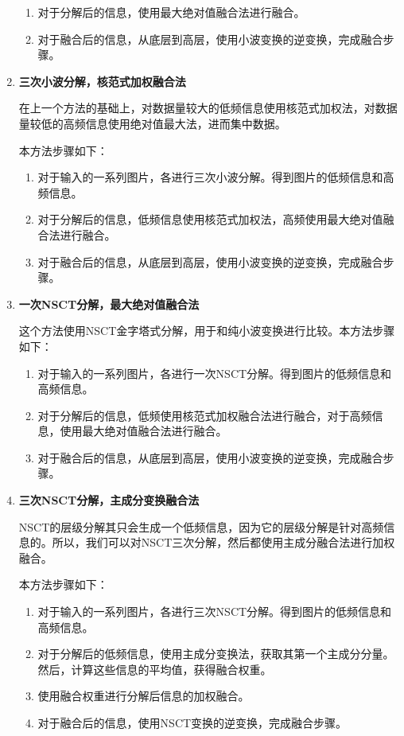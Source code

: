\documentclass{xduugthesis}
\begin{document}
\begin{enumerate}
\begin{enumerate}
	\item 对于分解后的信息，使用最大绝对值融合法进行融合。
	\item 对于融合后的信息，从底层到高层，使用小波变换的逆变换，完成融合步骤。
\end{enumerate}
\item \textbf{三次小波分解，核范式加权融合法}\par
在上一个方法的基础上，对数据量较大的低频信息使用核范式加权法，对数据量较低的高频信息使用绝对值最大法，进而集中数据。\par
本方法步骤如下：
\begin{enumerate}
	\item 对于输入的一系列图片，各进行三次小波分解。得到图片的低频信息和高频信息。
	\item 对于分解后的信息，低频信息使用核范式加权法，高频使用最大绝对值融合法进行融合。
	\item 对于融合后的信息，从底层到高层，使用小波变换的逆变换，完成融合步骤。
\end{enumerate}
\item \textbf{一次NSCT分解，最大绝对值融合法}\par
这个方法使用NSCT金字塔式分解，用于和纯小波变换进行比较。本方法步骤如下：
\begin{enumerate}
	\item 对于输入的一系列图片，各进行一次NSCT分解。得到图片的低频信息和高频信息。
	\item 对于分解后的信息，低频使用核范式加权融合法进行融合，对于高频信息，使用最大绝对值融合法进行融合。
	\item 对于融合后的信息，从底层到高层，使用小波变换的逆变换，完成融合步骤。
\end{enumerate}
\item \textbf{三次NSCT分解，主成分变换融合法}\par
NSCT的层级分解其只会生成一个低频信息，因为它的层级分解是针对高频信息的。所以，我们可以对NSCT三次分解，然后都使用主成分融合法进行加权融合。\par
本方法步骤如下：
\begin{enumerate}
	\item 对于输入的一系列图片，各进行三次NSCT分解。得到图片的低频信息和高频信息。
	\item 对于分解后的低频信息，使用主成分变换法，获取其第一个主成分分量。然后，计算这些信息的平均值，获得融合权重。
	\item 使用融合权重进行分解后信息的加权融合。
	\item 对于融合后的信息，使用NSCT变换的逆变换，完成融合步骤。
\end{enumerate}

\end{enumerate}
\end{document}
